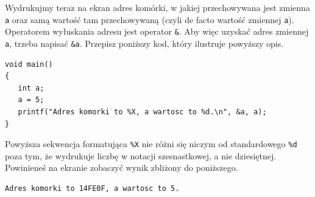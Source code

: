 \documentclass{instrukcja}
\begin{document}
Wydrukujmy teraz na ekran adres komórki, w jakiej przechowywana jest zmienna {\tt a} oraz samą wartość tam przechowywaną (czyli de facto wartość zmiennej {\tt a}). Operatorem wyłuskania adresu jest operator {\tt \&}. Aby więc uzyskać adres zmiennej {\tt a}, trzeba napisać {\tt \&a}. Przepisz poniższy kod, który ilustruje powyższy opis.
\begin{verbatim}
void main()
{
   int a;
   a = 5;
   printf("Adres komorki to %X, a wartosc to %d.\n", &a, a);
}
\end{verbatim}
Powyższa sekwencja formatująca {\tt \%X} nie różni się niczym od standardowego {\tt \%d} poza tym, że wydrukuje liczbę w notacji szesnastkowej, a nie dziesiętnej. Powinieneś na ekranie zobaczyć wynik zbliżony do poniższego.
\begin{verbatim}
Adres komorki to 14FE0F, a wartosc to 5.
\end{verbatim}
\end{document}
